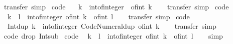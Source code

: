 \begin{isabellebody}
\ transfer\ simp%
\endisatagproof
{\isafoldproof}%
%
\isadelimproof
\isanewline
%
\endisadelimproof
\isanewline
{}\isamarkupfalse%
\ {\isacharbrackleft}code{\isacharbrackright}{\isacharcolon}\isanewline
\ \ {\isachardoublequoteopen}{\isacharminus}\ k\ {\isacharequal}\ int{\isacharunderscore}of{\isacharunderscore}integer\ {\isacharparenleft}{\isacharminus}\ of{\isacharunderscore}int\ k{\isacharparenright}{\isachardoublequoteclose}\isanewline
%
\isadelimproof
\ \ %
\endisadelimproof
%
\isatagproof
{}\isamarkupfalse%
\ transfer\ simp%
\endisatagproof
{\isafoldproof}%
%
\isadelimproof
\isanewline
%
\endisadelimproof
\isanewline
{}\isamarkupfalse%
\ {\isacharbrackleft}code{\isacharbrackright}{\isacharcolon}\isanewline
\ \ {\isachardoublequoteopen}k\ {\isacharminus}\ l\ {\isacharequal}\ int{\isacharunderscore}of{\isacharunderscore}integer\ {\isacharparenleft}of{\isacharunderscore}int\ k\ {\isacharminus}\ of{\isacharunderscore}int\ l{\isacharparenright}{\isachardoublequoteclose}\isanewline
%
\isadelimproof
\ \ %
\endisadelimproof
%
\isatagproof
{}\isamarkupfalse%
\ transfer\ simp%
\endisatagproof
{\isafoldproof}%
%
\isadelimproof
\isanewline
%
\endisadelimproof
\isanewline
{}\isamarkupfalse%
\ {\isacharbrackleft}code{\isacharbrackright}{\isacharcolon}\isanewline
\ \ {\isachardoublequoteopen}Int{\isachardot}dup\ k\ {\isacharequal}\ int{\isacharunderscore}of{\isacharunderscore}integer\ {\isacharparenleft}Code{\isacharunderscore}Numeral{\isachardot}dup\ {\isacharparenleft}of{\isacharunderscore}int\ k{\isacharparenright}{\isacharparenright}{\isachardoublequoteclose}\isanewline
%
\isadelimproof
\ \ %
\endisadelimproof
%
\isatagproof
{}\isamarkupfalse%
\ transfer\ simp%
\endisatagproof
{\isafoldproof}%
%
\isadelimproof
\isanewline
%
\endisadelimproof
\isanewline
{}\isamarkupfalse%
\ {\isacharbrackleft}{\isacharbrackleft}code\ drop{\isacharcolon}\ Int{\isachardot}sub{\isacharbrackright}{\isacharbrackright}\isanewline
\isanewline
{}\isamarkupfalse%
\ {\isacharbrackleft}code{\isacharbrackright}{\isacharcolon}\isanewline
\ \ {\isachardoublequoteopen}k\ {\isacharasterisk}\ l\ {\isacharequal}\ int{\isacharunderscore}of{\isacharunderscore}integer\ {\isacharparenleft}of{\isacharunderscore}int\ k\ {\isacharasterisk}\ of{\isacharunderscore}int\ l{\isacharparenright}{\isachardoublequoteclose}\isanewline
%
\isadelimproof
\ \ %
\endisadelimproof
%
\isatagproof
{}\isamarkupfalse%
\ simp%
\endisatagproof
{\isafoldproof}%
%
\isadelimproof
\isanewline

\end{isabellebody}
